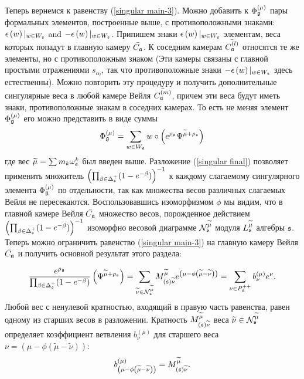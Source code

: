 Теперь вернемся к равенству (\ref{singular main-3}). Можно добавить к $\Phi _{\mathfrak{g}}^{\left( \mu \right) }$ пары формальных элементов, построенные выше, с противоположными знаками: $\epsilon \left( w\right)|_{w\in W_{\mathfrak{s}}}$ and $-\epsilon \left( w\right) |_{w\in W_{\mathfrak{s}}}$. 
Припишем знаки $\epsilon \left( w\right) |_{w\in W_{\mathfrak{s}}}$ элементам, веса которых попадут в главную камеру $\bar{C_{\mathfrak{a}}}$. К соседним камерам $\bar{C_{\mathfrak{a}}^{(l)}}$ относятся те же элементы, но  с противоположным знаком  (Эти камеры связаны с главной простыми отражениями $s_{\alpha _{l}}$, так что противоположные знаки $-\epsilon \left( w\right) |_{w\in W_{\mathfrak{s}}}$ здесь естественны). Можно повторить эту процедуру и получить дополнительные сингулярные веса в любой камере Вейля $\bar{C_{\mathfrak{a}}^{(m)}}$, причем эти веса будут иметь знаки, противоположные знакам в соседних камерах. То есть не меняя элемент $\Phi _{\mathfrak{g}}^{\left( \mu \right) }$ его можно представить в виде суммы
\begin{equation}
\Phi _{\mathfrak{g}}^{\left( \mu \right) }=\sum_{w\in W_{\mathfrak{a}}}w\circ \left(
e^{\rho _{\mathfrak{a}}}\Psi ^{\widetilde{\mu }+\rho _{\mathfrak{s}}}\right)
\label{singular final}
\end{equation}
где вес $\widetilde{\mu }=\sum m_{k}\omega _{\mathfrak{s}}^{k}$ был введен выше. Разложение (\ref{singular final}) позволяет применить множитель $\left( \prod_{\beta \in \Delta _{\mathfrak{s}}^{+}}(1-e^{-\beta })\right) ^{-1}$ к каждому слагаемому сингулярного элемента  $\Phi _{\mathfrak{g}}^{\left( \mu \right)}$ по отдельности, так как множества весов различных слагаемых Вейля не пересекаются. Воспользовавшись изоморфизмом  $\phi $ мы видим, что в главной камере Вейля  $\bar{C_{\mathfrak{a}}}$ множество весов, порожденное действием $\left( \prod_{\beta\in \Delta _{\mathfrak{s}}^{+}}(1-e^{-\beta })\right)^{-1}$ изоморфно весовой диаграмме  $\mathcal{N}_{\mathfrak{s}}^{\widetilde{\mu }}$  модуля  $L_{\mathfrak{s}}^{\widetilde{\mu }}$ алгебры $\mathfrak{s}$. Теперь можно ограничить равенство (\ref{singular main-3}) на главную камеру Вейля $\bar{C_{\mathfrak{a}}}$ и получить основной результат этого раздела:
\begin{Prop}
\begin{equation}
\frac{e^{\rho _{\gf}}}{\prod_{\beta \in \Delta _{\sfr%
}^{+}}(1-e^{-\beta })}\left( \Psi ^{\widetilde{\mu }+\rho _{\sfr%
}}\right) =\sum_{\widetilde{\nu }\in \mathcal{N}_{\sfr}^{\widetilde{\mu }%
}}M_{\left( \sfr\right) \widetilde{\nu }}^{\widetilde{\mu }}e^{\left(
\mu -\phi \left( \widetilde{\mu }-\widetilde{\nu }\right) \right)
}=\sum_{\nu \in P_{\af}^{++}}b_{\nu }^{(\mu )}e^{\nu }.
\label{singular main-4}
\end{equation}
Любой вес с ненулевой кратностью, входящий в правую часть равенства, равен одному из старших весов в разложении. Кратность $M_{\left( \mathfrak{s}
\right) \widetilde{\nu }}^{\widetilde{\mu }}$ веса  $\widetilde{\nu}\in \mathcal{N}_{\mathfrak{s}}^{\widetilde{\mu }}$ определяет коэффициент ветвления  $b_{\nu }^{(\mu )}$ для старшего веса $\nu =\left( \mu-\phi \left( \widetilde{\mu }-\widetilde{\nu }\right) \right) $:
\[
b_{\left( \mu -\phi \left( \widetilde{\mu }-\widetilde{\nu }\right) \right)
}^{(\mu )}=M_{\left( \mathfrak{s}\right) \widetilde{\nu }}^{\widetilde{\mu }}.
\]
\end{Prop}

